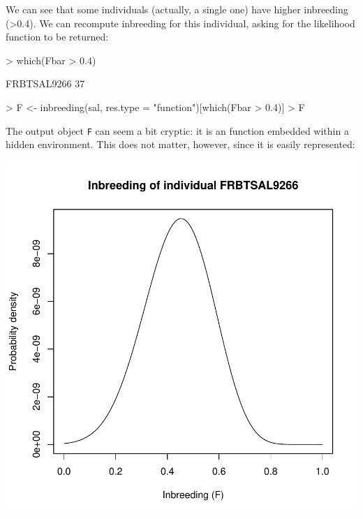 \documentclass{article}
\begin{document}
\noindent We can see that some individuals (actually, a single one) have higher inbreeding (>0.4). We can recompute
inbreeding for this individual, asking for the likelihood function to be returned:
\begin{Schunk}
\begin{Sinput}
> which(Fbar > 0.4)
\end{Sinput}
\begin{Soutput}
FRBTSAL9266 
         37 
\end{Soutput}
\begin{Sinput}
> F <- inbreeding(sal, res.type = "function")[which(Fbar > 0.4)]
> F
\end{Sinput}
\end{Schunk}
The output object \texttt{F} can seem a bit cryptic: it is an function embedded within a hidden environment.
This does not matter, however, since it is easily represented:
\begin{Schunk}
\end{Schunk}
\includegraphics{figs/base-065}
\end{document}
